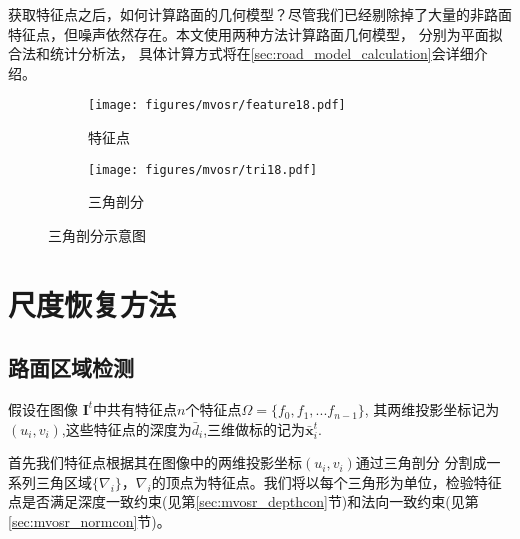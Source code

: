 获取特征点之后，如何计算路面的几何模型？尽管我们已经剔除掉了大量的非路面特征点，但噪声依然存在。本文使用两种方法计算路面几何模型，
分别为平面拟合法和统计分析法，
具体计算方式将在\ref{sec:road_model_calculation}会详细介绍。
\begin{figure}
    \centering
    \begin{subfigure}[b]{0.45\textwidth}
    \texttt{[image: figures/mvosr/feature18.pdf]}
    
    \caption{特征点}
    \label{fig:mvosr_feature}
    \end{subfigure}
    \begin{subfigure}[b]{0.45\textwidth}
    \texttt{[image: figures/mvosr/tri18.pdf]}
    \caption{三角剖分}
    \label{fig:mvosr_tri}
    \end{subfigure}
    \caption{三角剖分示意图}
    \label{fig:mvosr_road_feature}
    \end{figure}
\section{尺度恢复方法}
\label{sec:mvosr_method}


\subsection{路面区域检测}
\label{sec:road_detection}
假设在图像 $\mathbf{I}^{t}$中共有特征点$n$个特征点$\Omega=\{f_0,f_1,...f_{n-1}\}$,
其两维投影坐标记为 $(u_i,v_i)$,这些特征点的深度为$\bar{d}_i$,三维做标的记为$\mathbf{\bar{x}}_i^t$.

首先我们特征点根据其在图像中的两维投影坐标$(u_i,v_i)$通过三角剖分\cite{shewchuk1996triangle}
分割成一系列三角区域$\{\nabla_i\}$，$\nabla_i$的顶点为特征点。我们将以每个三角形为单位，检验特征点是否满足深度一致约束(见第\ref{sec:mvosr_depthcon}节)和法向一致约束(见第\ref{sec:mvosr_normcon}节)。

